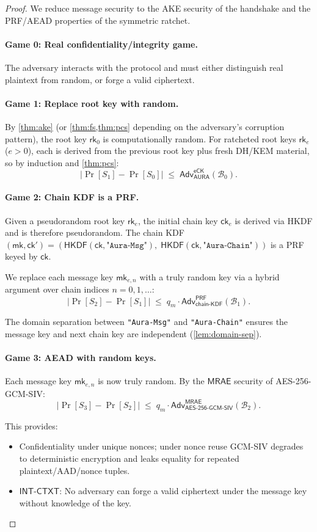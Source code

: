 \documentclass[11pt,a4paper]{article}
\theoremstyle{definition}
\theoremstyle{remark}
\newcommand{\adv}{\mathsf{Adv}}
\newcommand{\advB}{\mathcal{B}}
\newcommand{\HKDF}{\mathsf{HKDF}}
\newcommand{\AEAD}{\mathsf{AES\text{-}256\text{-}GCM\text{-}SIV}}
\newcommand{\INTCTXT}{\mathsf{INT\text{-}CTXT}}
\newcommand{\MRAE}{\mathsf{MRAE}}
\newcommand{\PRF}{\mathsf{PRF}}
\newcommand{\eCK}{\mathsf{eCK}}
\newcommand{\rk}{\mathsf{rk}}
\newcommand{\ck}{\mathsf{ck}}
\newcommand{\mk}{\mathsf{mk}}
\begin{document}
\begin{proof}
We reduce message security to the AKE security of the handshake and the
PRF/AEAD properties of the symmetric ratchet.

\paragraph{Game 0: Real confidentiality/integrity game.}
The adversary interacts with the protocol and must either distinguish real
plaintext from random, or forge a valid ciphertext.

\paragraph{Game 1: Replace root key with random.}
By \cref{thm:ake} (or \cref{thm:fs,thm:pcs} depending on the adversary's
corruption pattern), the root key $\rk_0$ is computationally random.  For
ratcheted root keys $\rk_e$ ($e > 0$), each is derived from the previous
root key plus fresh DH/KEM material, so by induction and \cref{thm:pcs}:
\[
  |\Pr[S_1] - \Pr[S_0]| \;\leq\; \adv^{\eCK}_{\mathsf{AURA}}(\advB_0).
\]

\paragraph{Game 2: Chain KDF is a PRF.}
Given a pseudorandom root key $\rk_e$, the initial chain key $\ck_e$ is
derived via HKDF and is therefore pseudorandom.  The chain KDF
$(\mk, \ck') = (\HKDF(\ck, \texttt{"Aura-Msg"}),\;
\HKDF(\ck, \texttt{"Aura-Chain"}))$
is a PRF keyed by $\ck$.

We replace each message key $\mk_{e,n}$ with a truly random key via a
hybrid argument over chain indices $n = 0, 1, \ldots$:
\[
  |\Pr[S_2] - \Pr[S_1]| \;\leq\; q_m \cdot \adv^{\PRF}_{\mathsf{chain\text{-}KDF}}(\advB_1).
\]

The domain separation between \texttt{"Aura-Msg"} and
\texttt{"Aura-Chain"} ensures the message key and next chain key are
independent (\cref{lem:domain-sep}).

\paragraph{Game 3: AEAD with random keys.}
Each message key $\mk_{e,n}$ is now truly random.  By the $\MRAE$
security of AES-256-GCM-SIV:
\[
  |\Pr[S_3] - \Pr[S_2]| \;\leq\; q_m \cdot \adv^{\MRAE}_{\AEAD}(\advB_2).
\]

This provides:
\begin{itemize}[nosep]
  \item Confidentiality under unique nonces; under nonce reuse GCM-SIV degrades
        to deterministic encryption and leaks equality for repeated
        plaintext/AAD/nonce tuples.
  \item $\INTCTXT$: No adversary can forge a valid ciphertext under the
        message key without knowledge of the key.
\end{itemize}


\end{proof}
\end{document}
